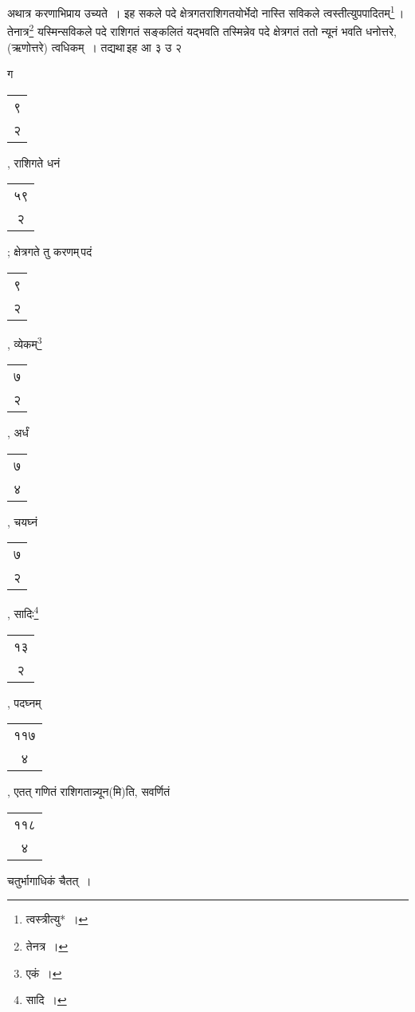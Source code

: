 \documentclass[10pt, openany]{book}
\begin{document}
{{{{{{{{{{अथात्र करणाभिप्राय उच्यते~। इह सकले पदे क्षेत्रगतराशिगतयोर्भेदो नास्ति
सविकले}
{त्वस्तीत्युपपादितम्\renewcommand{\thefootnote}{११}\footnote{त्वस्त्रीत्यु*~।}\,। तेनात्र\renewcommand{\thefootnote}{१२}\footnote{तेनत्र~।} यस्मिन्सविकले पदे राशिगतं
सङ्कलितं यद्भवति तस्मिन्नेव}
{पदे क्षेत्रगतं ततो न्यूनं भवति धनोत्तरे, (ऋणोत्तरे) त्वधिकम्~। तद्यथा\textendash \,इह आ ३ उ २}
{ग\begin{tabular}{c}९ \\२\end{tabular}, राशिगते धनं\begin{tabular}{c}५९\\ २\end{tabular}; क्षेत्रगते तु करणम्\textendash \,पदं\begin{tabular}{c}९ \\२\end{tabular}, व्येकम्\renewcommand{\thefootnote}{१३}\footnote{एकं~।}\begin{tabular}{c}७
\\२\end{tabular}, अर्धं\begin{tabular}{c}७ \\४\end{tabular}, चयघ्नं\begin{tabular}{c}७ \\२\end{tabular}, सादिः\renewcommand{\thefootnote}{१४}\footnote{सादि~।}}{\begin{tabular}{c}१३\\ २\end{tabular}, पदघ्नम्\begin{tabular}{c}११७\\ ४\end{tabular}, एतत् गणितं राशिगतान्न्यून(मि)ति, सवर्णितं\begin{tabular}{c}११८\\ ४\end{tabular}{चतुर्भागाधिकं चैतत्~।}

\newpage

\vspace{3mm}

}}}}}}}}}}
\end{document}
